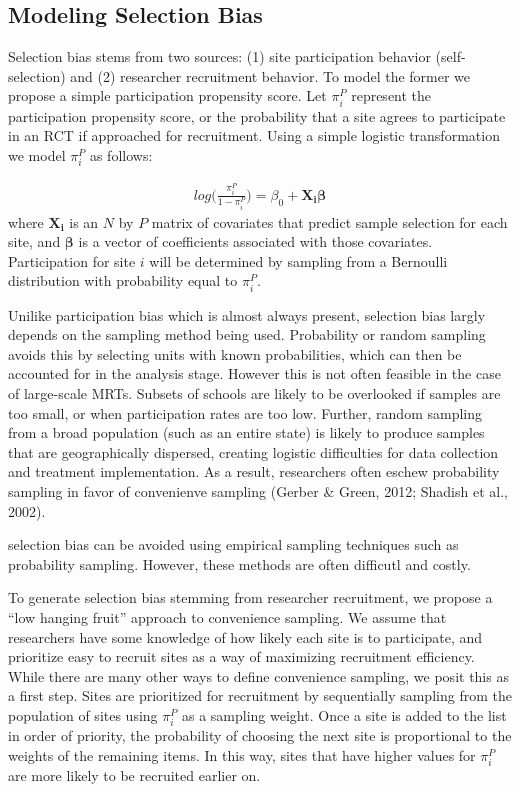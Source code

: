 \documentclass[man,floatsintext]{apa6}
\begin{document}
\hypertarget{modeling-selection-bias}{%
\subsection{Modeling Selection Bias}\label{modeling-selection-bias}}

Selection bias stems from two sources: (1) site participation behavior (self-selection) and (2) researcher recruitment behavior. To model the former we propose a simple participation propensity score. Let \(\pi^P_i\) represent the participation propensity score, or the probability that a site agrees to participate in an RCT if approached for recruitment. Using a simple logistic transformation we model \(\pi^P_i\) as follows:

\begin{align} \label{eq:RGM}
  log\bigg(\frac{\pi^P_i}{1 - \pi^P_i}\bigg) = \beta_0 + \boldsymbol{X_i \beta}
\end{align}
where \(\boldsymbol{X_i}\) is an \(N\) by \(P\) matrix of covariates that predict sample selection for each site, and \(\boldsymbol{\beta}\) is a vector of coefficients associated with those covariates. Participation for site \(i\) will be determined by sampling from a Bernoulli distribution with probability equal to \(\pi^P_i\).

Unilike participation bias which is almost always present, selection bias largly depends on the sampling method being used. Probability or random sampling avoids this by selecting units with known probabilities, which can then be accounted for in the analysis stage. However this is not often feasible in the case of large-scale MRTs. Subsets of schools are likely to be overlooked if samples are too small, or when participation rates are too low. Further, random sampling from a broad population (such as an entire state) is likely to produce samples that are geographically dispersed, creating logistic difficulties for data collection and treatment implementation. As a result, researchers often eschew probability sampling in favor of convenienve sampling (Gerber \& Green, 2012; Shadish et al., 2002).

selection bias can be avoided using empirical sampling techniques such as probability sampling. However, these methods are often difficutl and costly.

To generate selection bias stemming from researcher recruitment, we propose a \enquote{low hanging fruit} approach to convenience sampling. We assume that researchers have some knowledge of how likely each site is to participate, and prioritize easy to recruit sites as a way of maximizing recruitment efficiency. While there are many other ways to define convenience sampling, we posit this as a first step. Sites are prioritized for recruitment by sequentially sampling from the population of sites using \(\pi^P_i\) as a sampling weight. Once a site is added to the list in order of priority, the probability of choosing the next site is proportional to the weights of the remaining items. In this way, sites that have higher values for \(\pi^P_i\) are more likely to be recruited earlier on.
\end{document}
